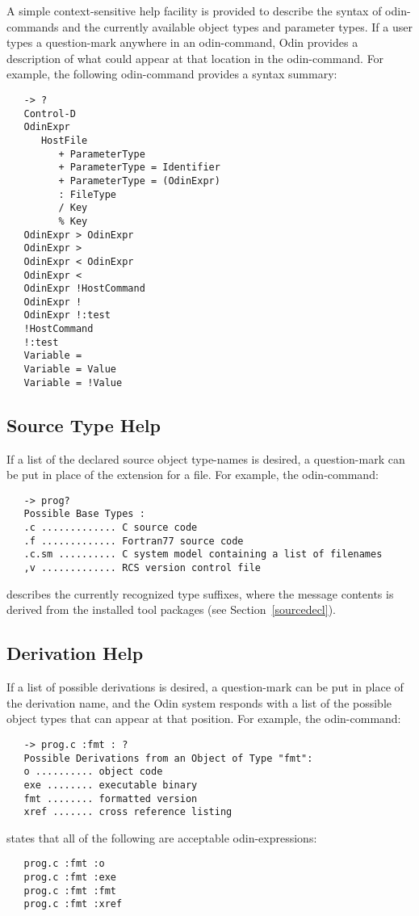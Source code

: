 \documentclass[hidelinks]{report}
\begin{document}
A simple context-sensitive help facility is provided
to describe the syntax of odin-commands
and the currently available object types and parameter types.
If a user types a question-mark anywhere in an odin-command,
Odin provides a description of what could appear at that location
in the odin-command.
For example, the following odin-command provides a syntax summary:
\begin{verbatim}
   -> ?
   Control-D
   OdinExpr
      HostFile
         + ParameterType
         + ParameterType = Identifier
         + ParameterType = (OdinExpr)
         : FileType
         / Key
         % Key
   OdinExpr > OdinExpr
   OdinExpr >
   OdinExpr < OdinExpr
   OdinExpr <
   OdinExpr !HostCommand
   OdinExpr !
   OdinExpr !:test
   !HostCommand
   !:test
   Variable =
   Variable = Value
   Variable = !Value
\end{verbatim}

\subsection{Source Type Help}

If a list of the declared source object type-names is desired,
a question-mark can be put in place of the extension for a file.
For example, the odin-command:
\begin{verbatim}
   -> prog?
   Possible Base Types :
   .c ............. C source code
   .f ............. Fortran77 source code
   .c.sm .......... C system model containing a list of filenames
   ,v ............. RCS version control file
\end{verbatim}
describes the currently recognized type suffixes,
where the message contents is derived from the installed tool packages
(see Section~\ref{sourcedecl}).

\subsection{Derivation Help}

If a list of possible derivations is desired,
a question-mark can be put in place of the derivation name,
and the Odin system responds with a list of the
possible object types that can appear at that position.
For example, the odin-command:
\begin{verbatim}
   -> prog.c :fmt : ?
   Possible Derivations from an Object of Type "fmt":
   o .......... object code
   exe ........ executable binary
   fmt ........ formatted version
   xref ....... cross reference listing
\end{verbatim}
states that all of the following are acceptable odin-expressions:
\begin{verbatim}
   prog.c :fmt :o
   prog.c :fmt :exe
   prog.c :fmt :fmt
   prog.c :fmt :xref
\end{verbatim}
\end{document}
